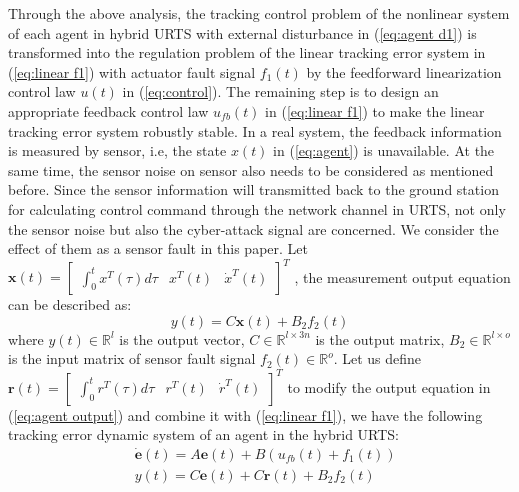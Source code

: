 \documentclass[journal,12pt,onecolumn,draftclsnofoot,]{IEEEtran}
\begin{document}
Through the above analysis, the tracking control problem of the nonlinear system of each agent in hybrid URTS with external disturbance in (\ref{eq:agent d1}) is transformed into the regulation problem of the linear tracking error system in (\ref{eq:linear f1}) with actuator fault signal $f_1(t)$ by the feedforward linearization control law $u(t)$ in (\ref{eq:control}). The remaining step is to design an appropriate feedback control law $u_{fb}(t)$ in (\ref{eq:linear f1}) to make the linear tracking error system robustly stable. In a real system, the feedback information is measured by sensor, i.e, the state $x(t)$ in (\ref{eq:agent}) is unavailable. At the same time, the sensor noise on sensor also needs to be considered as mentioned before. Since the sensor information will transmitted back to the ground station for calculating control command through the network channel in URTS, not only the sensor noise but also the cyber-attack signal are concerned. We consider the effect of them as a sensor fault in this paper. Let $\pmb{x}(t)=\begin{bmatrix}
    \int_{0}^{t}x^T(\tau)d\tau & x^T(t) & \dot{x}^T(t)
\end{bmatrix}^T$
, the measurement output equation can be described as:
\begin{equation} \label{eq:agent output}
    y(t) = C\pmb{x}(t) + B_2f_2(t)
\end{equation}
where $y(t)\in\mathbb{R}^{l}$ is the output vector, $C\in\mathbb{R}^{l\times 3n}$ is the output matrix, $B_2\in\mathbb{R}^{l\times o}$ is the input matrix of sensor fault signal $f_2(t)\in\mathbb{R}^o$. Let us define $\pmb{r}(t)=\begin{bmatrix}
    \int_{0}^{t}r^T(\tau)d\tau & r^T(t) & \dot{r}^T(t)
\end{bmatrix}^T$ to modify the output equation in (\ref{eq:agent output}) and combine it with (\ref{eq:linear f1}), we have the following tracking error dynamic system of an agent in the hybrid URTS:
\begin{equation} \label{eq:error}
    \begin{split}
        & \dot{\pmb{e}}(t)=A\pmb{e}(t)+B(u_{fb}(t)+f_1(t)) \\
        & y(t) = C\pmb{e}(t) + C\pmb{r}(t) + B_2f_2(t)   
    \end{split}  
\end{equation}
\end{document}

